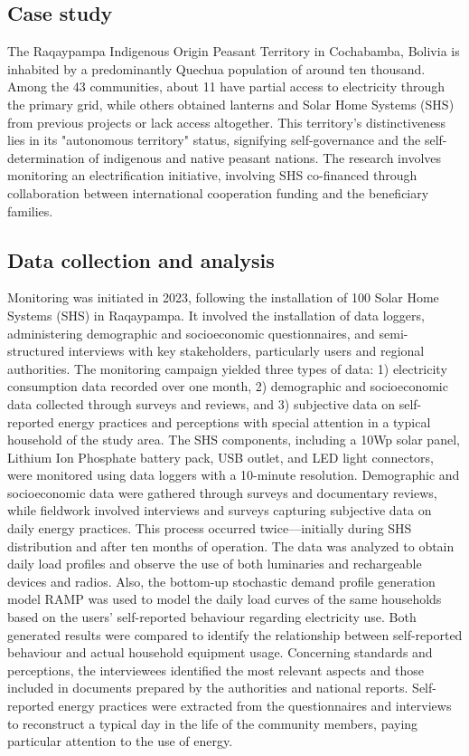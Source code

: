 \documentclass[final,3p,times,onecolumn]{elsarticle}
\begin{document}
\subsection{Case study}
The Raqaypampa Indigenous Origin Peasant Territory in Cochabamba, Bolivia is inhabited by a predominantly Quechua population of around ten thousand. Among the 43 communities, about 11 have partial access to electricity through the primary grid, while others obtained lanterns and Solar Home Systems (SHS) from previous projects or lack access altogether. This territory's distinctiveness lies in its "autonomous territory" status, signifying self-governance and the self-determination of indigenous and native peasant nations. The research involves monitoring an electrification initiative, involving SHS co-financed through collaboration between international cooperation funding and the beneficiary families.

\subsection{Data collection and analysis}
Monitoring was initiated in 2023, following the installation of 100 Solar Home Systems (SHS) in Raqaypampa. It involved the installation of data loggers, administering demographic and socioeconomic questionnaires, and semi-structured interviews with key stakeholders, particularly users and regional authorities. The monitoring campaign yielded three types of data: 1) electricity consumption data recorded over one month, 2) demographic and socioeconomic data collected through surveys and reviews, and 3) subjective data on self-reported energy practices and perceptions with special attention in a typical household of the study area. The SHS components, including a 10Wp solar panel, Lithium Ion Phosphate battery pack, USB outlet, and LED light connectors, were monitored using data loggers with a 10-minute resolution. Demographic and socioeconomic data were gathered through surveys and documentary reviews, while fieldwork involved interviews and surveys capturing subjective data on daily energy practices. This process occurred twice—initially during SHS distribution and after ten months of operation. 
The data was analyzed to obtain daily load profiles and observe the use of both luminaries and rechargeable devices and radios. Also, the bottom-up stochastic demand profile generation model RAMP \cite{Lombardi2019} was used to model the daily load curves of the same households based on the users' self-reported behaviour regarding electricity use. Both generated results were compared to identify the relationship between self-reported behaviour and actual household equipment usage. Concerning standards and perceptions, the interviewees identified the most relevant aspects and those included in documents prepared by the authorities and national reports. Self-reported energy practices were extracted from the questionnaires and interviews to reconstruct a typical day in the life of the community members, paying particular attention to the use of energy.
\end{document}
